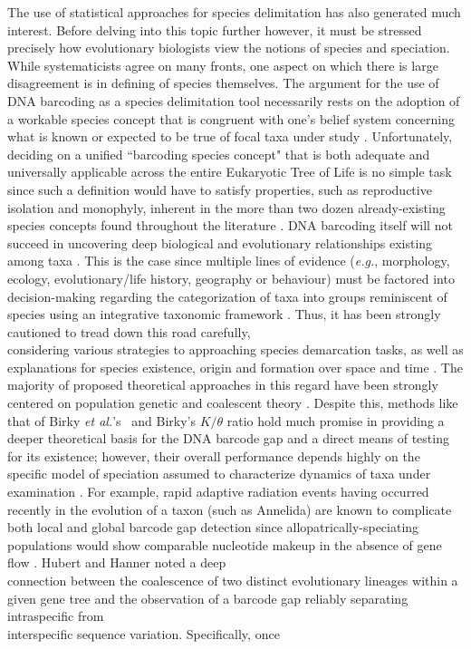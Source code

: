  

The use of statistical approaches for species delimitation has also generated much interest. Before delving into this topic further however, it must be stressed precisely how evolutionary biologists view the notions of species and speciation. While systematicists agree on many fronts, one aspect on which there is large disagreement is in defining of species themselves. The argument for the use of DNA barcoding as a species delimitation tool necessarily rests on the adoption of a workable species concept that is congruent with one's belief system concerning what is known or expected to be true of focal taxa under study \cite{miller2007dna, pante2015species, will2005perils}. Unfortunately, deciding on a unified ``barcoding species concept" that is both adequate and universally applicable across the entire Eukaryotic Tree of Life is no simple task since such a definition would have to satisfy properties, such as reproductive isolation and monophyly, inherent in the more than two dozen already-existing species concepts found throughout the literature \cite{dequeiroz2007species}. DNA barcoding itself will not succeed in uncovering deep biological and evolutionary relationships existing among taxa \cite{will2005perils}. This is the case since multiple lines of evidence (\textit{e.g.}, morphology, ecology, evolutionary/life history, geography or behaviour) must be factored into decision-making regarding the categorization of taxa into groups reminiscent of species using an integrative taxonomic framework \cite{dayrat2005towards}. Thus, it has been strongly cautioned to tread down this road carefully, \\ considering various strategies to approaching species demarcation tasks, as well as \\ explanations for species existence, origin and formation over space and time \cite{carstens2013fail}. The majority of proposed theoretical approaches in this regard have been strongly centered on population genetic and coalescent theory \cite{kingman1982coalescent}. Despite this, methods like that of Birky \textit{et al.}'s~\cite{birky2010using} and Birky's \cite{birky2013species} $K/\theta$ ratio hold much promise in providing a deeper theoretical basis for the DNA barcode gap and a direct means of testing for its existence; however, their overall performance depends highly on the specific model of speciation assumed to characterize dynamics of taxa under examination \cite{fujisawa2013delimiting, kapli2017multirate, monaghan2009accelerated, pons2006sequence, puillandre2011abgd, zhang2013general}. For example, rapid adaptive radiation events having occurred recently in the evolution of a taxon (such as Annelida) are known to complicate both local and global barcode gap detection since allopatrically-speciating populations would show comparable nucleotide makeup in the absence of gene flow \cite{kvist2017does}. Hubert and Hanner \cite{hubert2015dna} noted a deep \\ connection between the coalescence of two distinct evolutionary lineages within a given gene tree and the observation of a barcode gap reliably separating intraspecific from \\ interspecific sequence variation. Specifically, once 